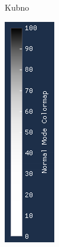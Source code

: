 \documentclass[times, utf8, diplomski]{fer}
\begin{document}
\begin{figure} [h]
\begin{subfigure}[h]{0.15\textwidth}
         \caption{Kubno}
         \label{fig:cubic_legend}
     \end{subfigure}
     \hfill
     \begin{subfigure}[h]{0.15\textwidth}
         \centering
         \includegraphics[width=\textwidth]{quartic_colormap.png}

\end{subfigure}
\end{figure}
\end{document}
